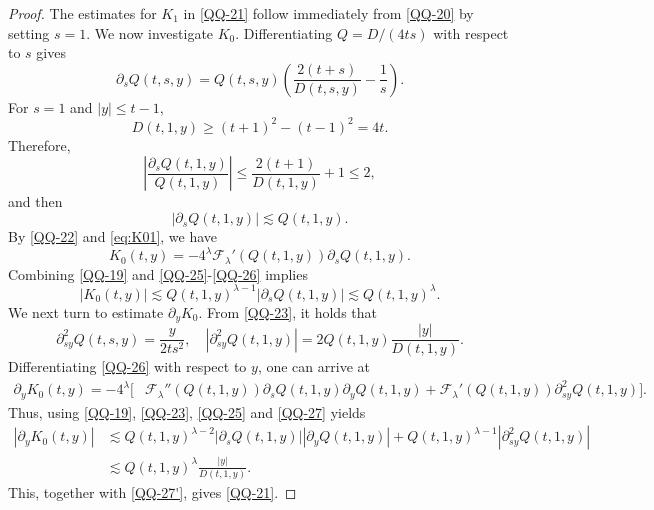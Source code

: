 \documentclass[11pt,twoside]{article}
\newcommand{\p}{\partial}
\newcommand{\f}{\frac}
\theoremstyle{plain}
\theoremstyle{definition}
\theoremstyle{remark}
\numberwithin{equation}{section}
\begin{document}
\begin{proof}
The estimates for $K_1$ in \eqref{QQ-21} follow immediately from
\eqref{QQ-20} by setting $s=1$. We now investigate $K_0$.
Differentiating $Q=D/(4ts)$ with respect to $s$ gives
\begin{equation}\label{QQ-24}
\p_sQ(t,s,y)
=Q(t,s,y)
\left(
\f{2(t+s)}{D(t,s,y)}-\f1s
\right).
\end{equation}
For $s=1$ and $|y|\leq t-1$,
\[
D(t,1,y)
\geq
(t+1)^2-(t-1)^2
=4t.
\]
Therefore,
\[
\left|
\f{\p_sQ(t,1,y)}{Q(t,1,y)}
\right|
\leq
\f{2(t+1)}{D(t,1,y)}+1
\leq2,
\]
and then
\begin{equation}\label{QQ-25}
|\p_sQ(t,1,y)|
\lesssim
Q(t,1,y).
\end{equation}
By \eqref{QQ-22} and \eqref{eq:K01}, we have
\begin{equation}\label{QQ-26}
K_0(t,y)
=-4^\lambda
\mathcal F_\lambda'(Q(t,1,y))\p_sQ(t,1,y).
\end{equation}
Combining \eqref{QQ-19} and \eqref{QQ-25}-\eqref{QQ-26} implies
\begin{equation}\label{QQ-27'}
|K_0(t,y)|
\lesssim
Q(t,1,y)^{\lambda-1}|\p_sQ(t,1,y)|
\lesssim
Q(t,1,y)^\lambda.
\end{equation}
We next turn to estimate $\p_yK_0$. From \eqref{QQ-23}, it holds that
\begin{equation}\label{QQ-27}
\p_{sy}^2Q(t,s,y)
=\f{y}{2ts^2},
\quad
|\p_{sy}^2Q(t,1,y)|
=2Q(t,1,y)\f{|y|}{D(t,1,y)}.
\end{equation}
Differentiating \eqref{QQ-26} with respect to $y$, one can arrive at
\begin{equation}\label{QQ-28}
\begin{aligned}
\p_yK_0(t,y)
=-4^\lambda\bigl[
&\mathcal F_\lambda''(Q(t,1,y))
\p_sQ(t,1,y)\p_yQ(t,1,y)+
\mathcal F_\lambda'(Q(t,1,y))
\p_{sy}^2Q(t,1,y)
\bigr].
\end{aligned}
\end{equation}
Thus, using \eqref{QQ-19}, \eqref{QQ-23}, \eqref{QQ-25} and
\eqref{QQ-27} yields
\[
\begin{aligned}
|\p_yK_0(t,y)|
&\lesssim
Q(t,1,y)^{\lambda-2}
|\p_sQ(t,1,y)||\p_yQ(t,1,y)|
+Q(t,1,y)^{\lambda-1}|\p_{sy}^2Q(t,1,y)|\\
&\lesssim
Q(t,1,y)^\lambda
\f{|y|}{D(t,1,y)}.
\end{aligned}
\]
This, together with \eqref{QQ-27'}, gives \eqref{QQ-21}.
\end{proof}
\end{document}
